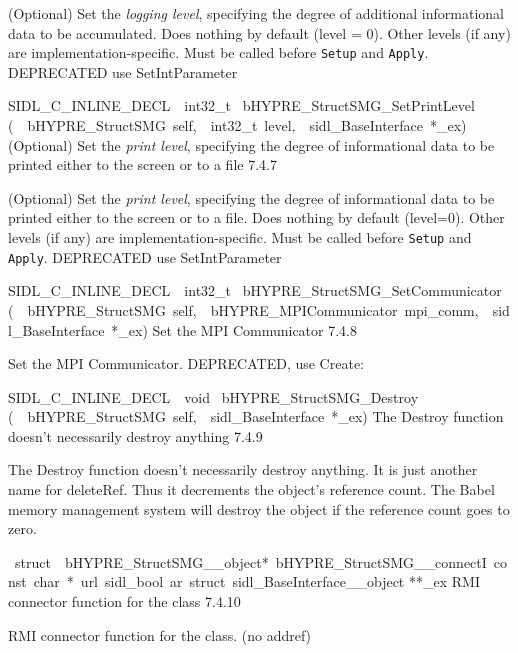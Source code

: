 \documentclass{article}
\begin{document}
\begin{cxxentry}
\begin{cxxentry}
\begin{cxxfunction}
\begin{cxxdoc}
(Optional) Set the {\it logging level}, specifying the degree
of additional informational data to be accumulated.  Does
nothing by default (level = 0).  Other levels (if any) are
implementation-specific.  Must be called before {\tt Setup}
and {\tt Apply}.
DEPRECATED   use SetIntParameter
\end{cxxdoc}
\end{cxxfunction}
\begin{cxxfunction}
{SIDL\_C\_INLINE\_DECL\ \ int32\_t\ }
        {bHYPRE\_StructSMG\_SetPrintLevel}
        {(\ \ bHYPRE\_StructSMG\ self,\ \ int32\_t\ level,\ \ sidl\_BaseInterface\ *\_ex)}
        {
(Optional) Set the {\it print level}, specifying the degree
of informational data to be printed either to the screen or
to a file}
        {7.4.7}
\begin{cxxdoc}

(Optional) Set the {\it print level}, specifying the degree
of informational data to be printed either to the screen or
to a file.  Does nothing by default (level=0).  Other levels
(if any) are implementation-specific.  Must be called before
{\tt Setup} and {\tt Apply}.
DEPRECATED   use SetIntParameter
\end{cxxdoc}
\end{cxxfunction}
\begin{cxxfunction}
{SIDL\_C\_INLINE\_DECL\ \ int32\_t\ }
        {bHYPRE\_StructSMG\_SetCommunicator}
        {(\ \ bHYPRE\_StructSMG\ self,\ \ bHYPRE\_MPICommunicator\ mpi\_comm,\ \ sidl\_BaseInterface\ *\_ex)}
        {
Set the MPI Communicator}
        {7.4.8}
\begin{cxxdoc}

Set the MPI Communicator.
DEPRECATED, use Create:
\end{cxxdoc}
\end{cxxfunction}
\begin{cxxfunction}
{SIDL\_C\_INLINE\_DECL\ \ void\ }
        {bHYPRE\_StructSMG\_Destroy}
        {(\ \ bHYPRE\_StructSMG\ self,\ \ sidl\_BaseInterface\ *\_ex)}
        {
The Destroy function doesn't necessarily destroy anything}
        {7.4.9}
\begin{cxxdoc}

The Destroy function doesn't necessarily destroy anything.
It is just another name for deleteRef.  Thus it decrements the
object's reference count.  The Babel memory management system will
destroy the object if the reference count goes to zero.
\end{cxxdoc}
\end{cxxfunction}
\begin{cxxvariable}
{\ struct\ \ bHYPRE\_StructSMG\_\_object*\ bHYPRE\_StructSMG\_\_connectI\ const\ char\ *\ url\ sidl\_bool\ ar\ struct\ sidl\_BaseInterface\_\_object}
        {**\_ex}
        {}
        {
RMI connector function for the class}
        {7.4.10}
\begin{cxxdoc}

RMI connector function for the class. (no addref)
\end{cxxdoc}
\end{cxxvariable}
\end{cxxentry}
\end{cxxentry}
\end{document}
